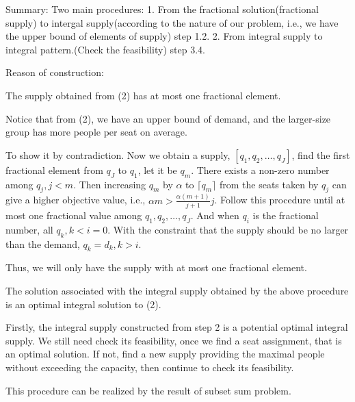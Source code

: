 Summary:
Two main procedures: 1. From the fractional solution(fractional supply) to intergal supply(according to the nature of our problem, i.e., we have the upper bound of elements of supply)  step 1.2.
2. From integral supply to integral pattern.(Check the feasibility)  step 3.4.

Reason of construction:

\begin{thm}
  The supply obtained from (2) has at most one fractional element.
\end{thm}

Notice that from (2), we have an upper bound of demand, and the larger-size group has more people per seat on average.


To show it by contradiction. Now we obtain a supply, $[q_1, q_2, \ldots, q_{J}]$, find the first fractional element from $q_{J}$ to $q_{1}$, let it be $q_{m}$. There exists a non-zero number among $q_{j}, j<m$. Then increasing $q_{m}$ by $\alpha$ to $\lceil q_{m} \rceil$ from the seats taken by $q_{j}$ can give a higher objective value, i.e., $\alpha m > \frac{\alpha(m+1)}{j+1} j$. Follow this procedure until at most one fractional value among $q_1, q_2, \ldots, q_{J}$. 
And when $q_i$ is the fractional number, all $q_k, k<i =0$. With the constraint that the supply should be no larger than the demand, $q_k = d_k, k>i$.

Thus, we will only have the supply with at most one fractional element.

\begin{corollary}
 The solution associated with the integral supply obtained by the above procedure is an optimal integral solution to (2).
\end{corollary}

Firstly, the integral supply constructed from step 2 is a potential optimal integral supply. We still need check its feasibility, once we find a seat assignment, that is an optimal solution. If not, find a new supply providing the maximal people without exceeding the capacity, then continue to check its feasibility.

This procedure can be realized by the result of subset sum problem.




